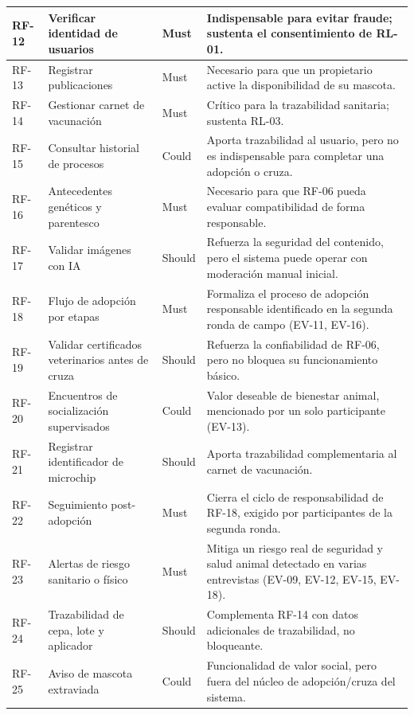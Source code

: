 \documentclass[journal,onecolumn]{IEEEtran}
\begin{document}
\begin{longtable}{@{}p{1.6cm} p{4.8cm} p{1.6cm} p{5.2cm}@{}}
		\hline
		RF-12 & Verificar identidad de usuarios & Must & Indispensable para evitar fraude; sustenta el consentimiento de RL-01. \\
		\hline
		RF-13 & Registrar publicaciones & Must & Necesario para que un propietario active la disponibilidad de su mascota. \\
		\hline
		RF-14 & Gestionar carnet de vacunación & Must & Crítico para la trazabilidad sanitaria; sustenta RL-03. \\
		\hline
		RF-15 & Consultar historial de procesos & Could & Aporta trazabilidad al usuario, pero no es indispensable para completar una adopción o cruza. \\
		\hline
		RF-16 & Antecedentes genéticos y parentesco & Must & Necesario para que RF-06 pueda evaluar compatibilidad de forma responsable. \\
		\hline
		RF-17 & Validar imágenes con IA & Should & Refuerza la seguridad del contenido, pero el sistema puede operar con moderación manual inicial. \\
		\hline
		RF-18 & Flujo de adopción por etapas & Must & Formaliza el proceso de adopción responsable identificado en la segunda ronda de campo (EV-11, EV-16). \\
		\hline
		RF-19 & Validar certificados veterinarios antes de cruza & Should & Refuerza la confiabilidad de RF-06, pero no bloquea su funcionamiento básico. \\
		\hline
		RF-20 & Encuentros de socialización supervisados & Could & Valor deseable de bienestar animal, mencionado por un solo participante (EV-13). \\
		\hline
		RF-21 & Registrar identificador de microchip & Should & Aporta trazabilidad complementaria al carnet de vacunación. \\
		\hline
		RF-22 & Seguimiento post-adopción & Must & Cierra el ciclo de responsabilidad de RF-18, exigido por participantes de la segunda ronda. \\
		\hline
		RF-23 & Alertas de riesgo sanitario o físico & Must & Mitiga un riesgo real de seguridad y salud animal detectado en varias entrevistas (EV-09, EV-12, EV-15, EV-18). \\
		\hline
		RF-24 & Trazabilidad de cepa, lote y aplicador & Should & Complementa RF-14 con datos adicionales de trazabilidad, no bloqueante. \\
		\hline
		RF-25 & Aviso de mascota extraviada & Could & Funcionalidad de valor social, pero fuera del núcleo de adopción/cruza del sistema. \\

\end{longtable}
\end{document}
